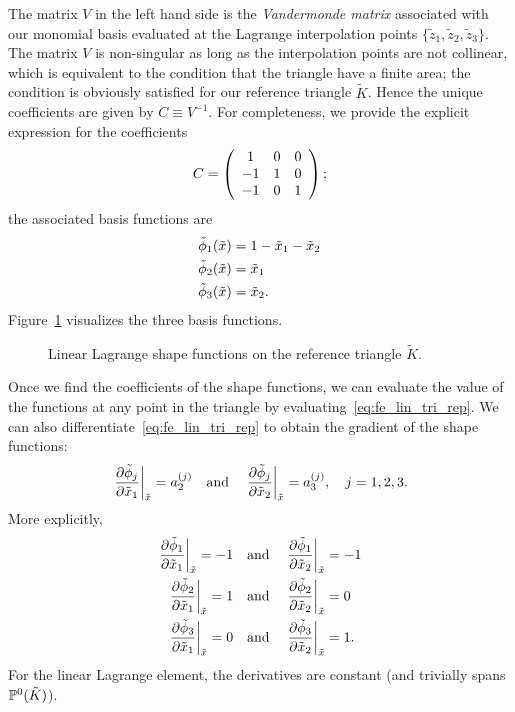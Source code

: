 The matrix $V$ in the left hand side is the \emph{Vandermonde matrix} associated with our monomial basis evaluated at the Lagrange interpolation points $\{\tilde z_1,\tilde z_2, \tilde z_3\}$.  The matrix $V$ is non-singular as long as the interpolation points are not collinear, which is equivalent to the condition that the triangle have a finite area; the condition is obviously satisfied for our reference triangle $\tilde K$. Hence the unique coefficients are given by $C \equiv V^{-1}$.  For completeness, we provide the explicit expression for the coefficients 
\begin{equation*}
  C = \bmat{ccc}
  1 & 0 & 0\\
  -1 & 1 & 0 \\
  -1 & 0 & 1
  \emat;
\end{equation*}
the associated basis functions are
\begin{align}
  \tilde \phi_1(\tilde x) &= 1 - \tilde x_1 - \tilde x_2 \notag \\
  \tilde \phi_2(\tilde x) &= \tilde x_1 \label{eq:fe_lin_tri_expl} \\
  \tilde \phi_3(\tilde x) &= \tilde x_2. \notag
\end{align}
Figure~\ref{fig:fe_shape_tri_p1} visualizes the three basis functions.

\begin{figure}
  \centering
  \caption{Linear Lagrange shape functions on the reference triangle $\tilde K$.}
  \label{fig:fe_shape_tri_p1}
\end{figure}

Once we find the coefficients of the shape functions, we can evaluate the value of the functions at any point in the triangle by evaluating~\eqref{eq:fe_lin_tri_rep}. We can also differentiate~\eqref{eq:fe_lin_tri_rep} to obtain the gradient of the shape functions:
\begin{equation*}
  \left. \pp{\tilde \phi_j}{\tilde x_1} \right|_{\tilde x} = a_2^{(j)} \quad \text{and} \quad  \left. \pp{\tilde \phi_j}{\tilde x_2} \right|_{\tilde x} = a_3^{(j)}, \quad j = 1,2,3.
\end{equation*}
More explicitly,
\begin{align*}
  \left. \pp{\tilde \phi_1}{\tilde x_1} \right|_{\tilde x} = -1
  \quad &\text{and} \quad
  \left. \pp{\tilde \phi_1}{\tilde x_2} \right|_{\tilde x} = -1\\
  \left. \pp{\tilde \phi_2}{\tilde x_1} \right|_{\tilde x} = 1
  \quad &\text{and} \quad
  \left. \pp{\tilde \phi_2}{\tilde x_2} \right|_{\tilde x} = 0\\
  \left. \pp{\tilde \phi_3}{\tilde x_1} \right|_{\tilde x} = 0
  \quad &\text{and} \quad
  \left. \pp{\tilde \phi_3}{\tilde x_2} \right|_{\tilde x} = 1.
\end{align*}
For the linear Lagrange element, the derivatives are constant (and trivially spans $\PP^0(\tilde K)$).

